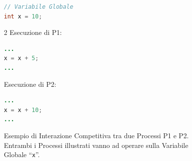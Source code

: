 \begin{figure}[H]   
    \centering
    \begin{lstlisting}[language=Java]
// Variabile Globale
int x = 10;
    \end{lstlisting}
    \begin{multicols}{2}
        Esecuzione di P1:
        \begin{lstlisting}[language=Java]
...
x = x + 5;
...
        \end{lstlisting}
        \columnbreak
        Esecuzione di P2:
        \begin{lstlisting}[language=Java]
...
x = x + 10;
...
        \end{lstlisting}    
    \end{multicols}
    \caption[Esempio di Interazione Competitiva tra due Processi P1 e P2]{Esempio di Interazione Competitiva tra due Processi P1 e P2. Entrambi i Processi illustrati vanno ad operare sulla Variabile Globale ``\texttt{x}''.}
    \label{fig.InterazioneConcorrente}
\end{figure}